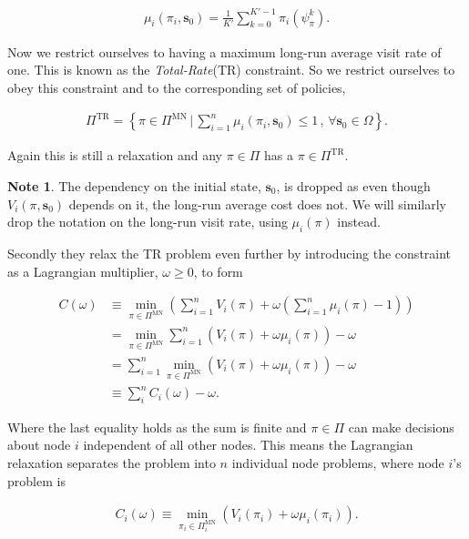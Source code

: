 \documentclass[a4paper,10pt]{article}
\theoremstyle{definition}
\theoremstyle{definition}
\theoremstyle{remark}
\theoremstyle{definition}
\newtheorem*{note}{Note}
\begin{document}
\begin{align*}
\mu_{i}(\pi_{i},\bm{s}_{0})=\frac{1}{K'} \sum\limits_{k=0}^{K'-1} \pi_{i}(\psi^{k}_{\pi}).
\end{align*}

Now we restrict ourselves to having a maximum long-run average visit rate of one. This is known as the \textit{Total-Rate}(TR) constraint. So we restrict ourselves to obey this constraint and to the corresponding set of policies,

\begin{align*}
\Pi^{\text{TR}}=\left\{ \pi \in \Pi^{\text{MN}} \, \bigg| \, \sum\limits_{i=1}^{n} \mu_{i}(\pi_{i},\bm{s}_{0}) \leq 1 \, , \, \forall \bm{s}_{0} \in \Omega \right\}.
\end{align*}

Again this is still a relaxation and any $\pi \in \Pi$ has a $\pi \in \Pi^{\text{TR}}$.

\begin{note}
The dependency on the initial state, $\bm{s}_{0}$, is dropped as even though $V_{i}(\pi,\bm{s}_{0})$ depends on it, the long-run average cost does not. We will similarly drop the notation on the long-run visit rate, using $\mu_{i}(\pi)$ instead.
\end{note}

Secondly they relax the TR problem even further by introducing the constraint as a Lagrangian multiplier, $\omega \geq 0$, to form

\begin{align*}
C(\omega) & \equiv \min\limits_{\pi \in \Pi^{\text{MN}}} \left(\sum\limits_{i=1}^{n} V_{i}(\pi) + \omega \left(\sum\limits_{i=1}^{n} \mu_{i}(\pi) -1\right) \right) \\
&= \min\limits_{\pi \in \Pi^{\text{MN}}} \sum\limits_{i=1}^{n} \left(V_{i}(\pi) + \omega \mu_{i}(\pi)\right)  -\omega \\
& = \sum\limits_{i=1}^{n} \min\limits_{\pi \in \Pi^{\text{MN}}} (V_{i}(\pi) +\omega\mu_{i}(\pi)) -\omega \\
& \equiv \sum\limits_{i}^{n} C_{i}(\omega) -\omega.
\end{align*}

Where the last equality holds as the sum is finite and $\pi \in \Pi$ can make decisions about node $i$ independent of all other nodes. This means the Lagrangian relaxation separates the problem into $n$ individual node problems, where node $i$'s problem is

\begin{align*}
C_{i}(\omega) \equiv \min\limits_{\pi_{i} \in \Pi^{\text{MN}}_{i}} \left(V_{i}(\pi_{i}) + \omega \mu_{i}(\pi_{i})\right).
\end{align*}
\end{document}
